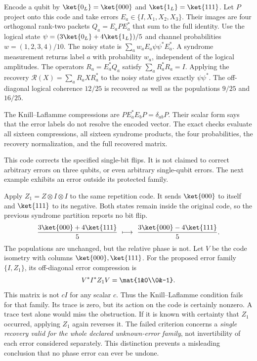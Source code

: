 Encode a qubit by $\ket{0_L}=\ket{000}$ and $\ket{1_L}=\ket{111}$. Let $P$ project onto this code and take errors $E_a\in\{I,X_1,X_2,X_3\}$. Their images are four orthogonal rank-two packets $Q_a=E_aPE_a^*$ that sum to the full identity.
Use the logical state $\psi=(3\ket{0_L}+4\ket{1_L})/5$ and channel probabilities $w=(1,2,3,4)/10$. The noisy state is $\sum_aw_aE_a\psi\psi^*E_a^*$. A syndrome measurement returns label $a$ with probability $w_a$, independent of the logical amplitudes.
The operators $R_a=E_a^*Q_a$ satisfy $\sum_aR_a^*R_a=I$. Applying the recovery $\mathcal R(X)=\sum_aR_aXR_a^*$ to the noisy state gives exactly $\psi\psi^*$. The off-diagonal logical coherence $12/25$ is recovered as well as the populations $9/25$ and $16/25$.

The Knill--Laflamme compressions are $PE_a^*E_bP=\delta_{ab}P$. Their scalar form says that the error labels do not resolve the encoded vector. The exact checks evaluate all sixteen compressions, all sixteen syndrome products, the four probabilities, the recovery normalization, and the full recovered matrix.

This code corrects the specified single-bit flips. It is not claimed to correct arbitrary errors on three qubits, or even arbitrary single-qubit errors. The next example exhibits an error outside its protected family.

Apply $Z_1=Z\otimes I\otimes I$ to the same repetition code. It sends $\ket{000}$ to itself and $\ket{111}$ to its negative. Both states remain inside the original code, so the previous syndrome partition reports no bit flip.
\[
\frac{3\ket{000}+4\ket{111}}5
\ \longmapsto\
\frac{3\ket{000}-4\ket{111}}5.
\]
The populations are unchanged, but the relative phase is not.
Let $V$ be the code isometry with columns $\ket{000},\ket{111}$. For the proposed error family $\{I,Z_1\}$, its off-diagonal error compression is
\[
V^*I^*Z_1V=\mat{1&0\\0&-1}.
\]
This matrix is not $cI$ for any scalar $c$. Thus the Knill--Laflamme condition fails for that family. Its trace is zero, but its action on the code is certainly nonzero. A trace test alone would miss the obstruction.
\head{Known correction versus family recovery}
If it is known with certainty that $Z_1$ occurred, applying $Z_1$ again reverses it. The failed criterion concerns a \emph{single recovery valid for the whole declared unknown-error family}, not invertibility of each error considered separately. This distinction prevents a misleading conclusion that no phase error can ever be undone.


